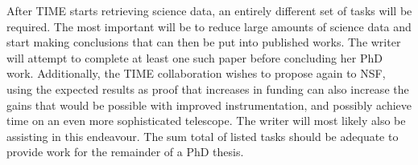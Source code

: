 \documentclass[manuscript]{aastex}
\begin{document}
After TIME starts retrieving science data, an entirely different set of tasks will be required. The most important will be to reduce large amounts of science data and start making conclusions that can then be put into published works. The writer will attempt to complete at least one such paper before concluding her PhD work.  Additionally, the TIME collaboration wishes to propose again to NSF, using the expected results as proof that increases in funding can also increase the gains that would be possible with improved instrumentation, and possibly achieve time on an even more sophisticated telescope. The writer will most likely also be assisting in this endeavour. The sum total of listed tasks should be adequate to provide work for the remainder of a PhD thesis.
\newpage
\renewcommand\bibsection{\section{\refname}}



\newpage
\appendix
\end{document}
